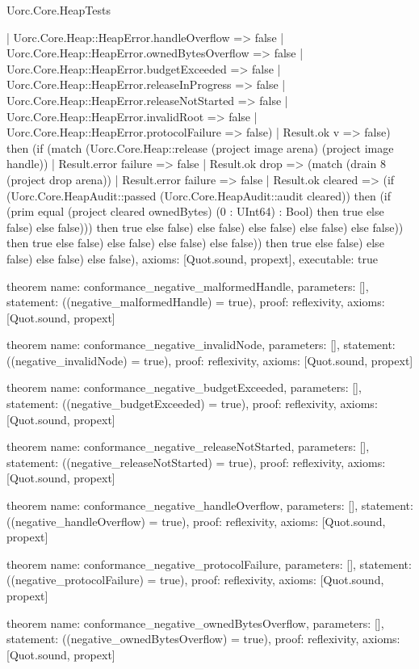 \begin{lexlean}{Uorc.Core.HeapTests}
\begin{semanticmodule}
{          | Uorc.Core.Heap::HeapError.handleOverflow => false
          | Uorc.Core.Heap::HeapError.ownedBytesOverflow => false
          | Uorc.Core.Heap::HeapError.budgetExceeded => false
          | Uorc.Core.Heap::HeapError.releaseInProgress => false
          | Uorc.Core.Heap::HeapError.releaseNotStarted => false
          | Uorc.Core.Heap::HeapError.invalidRoot => false
          | Uorc.Core.Heap::HeapError.protocolFailure => false)
        | Result.ok v => false) then (if (match (Uorc.Core.Heap::release (project image arena) (project image handle))
        | Result.error failure => false
        | Result.ok drop => (match (drain 8 (project drop arena))
          | Result.error failure => false
          | Result.ok cleared => (if (Uorc.Core.HeapAudit::passed (Uorc.Core.HeapAudit::audit cleared)) then (if (prim equal (project cleared ownedBytes) (0 : UInt64) : Bool) then true else false) else false))) then true else false) else false) else false) else false) else false)) then true else false) else false) else false) else false)) then true else false) else false) else false) else false),
  axioms: [Quot.sound, propext],
  executable: true
}

theorem{
  name: conformance_negative_malformedHandle,
  parameters: [],
  statement: ((negative_malformedHandle) = true),
  proof: reflexivity{},
  axioms: [Quot.sound, propext]
}

theorem{
  name: conformance_negative_invalidNode,
  parameters: [],
  statement: ((negative_invalidNode) = true),
  proof: reflexivity{},
  axioms: [Quot.sound, propext]
}

theorem{
  name: conformance_negative_budgetExceeded,
  parameters: [],
  statement: ((negative_budgetExceeded) = true),
  proof: reflexivity{},
  axioms: [Quot.sound, propext]
}

theorem{
  name: conformance_negative_releaseNotStarted,
  parameters: [],
  statement: ((negative_releaseNotStarted) = true),
  proof: reflexivity{},
  axioms: [Quot.sound, propext]
}

theorem{
  name: conformance_negative_handleOverflow,
  parameters: [],
  statement: ((negative_handleOverflow) = true),
  proof: reflexivity{},
  axioms: [Quot.sound, propext]
}

theorem{
  name: conformance_negative_protocolFailure,
  parameters: [],
  statement: ((negative_protocolFailure) = true),
  proof: reflexivity{},
  axioms: [Quot.sound, propext]
}

theorem{
  name: conformance_negative_ownedBytesOverflow,
  parameters: [],
  statement: ((negative_ownedBytesOverflow) = true),
  proof: reflexivity{},
  axioms: [Quot.sound, propext]
}


\end{semanticmodule}
\end{lexlean}
